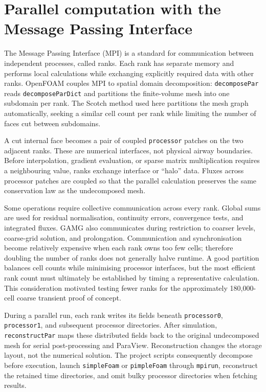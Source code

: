 \documentclass[11pt,a4paper]{article}
\begin{document}
\section{Parallel computation with the Message Passing Interface}
\label{app:mpi}

The Message Passing Interface (MPI) is a standard for communication between
independent processes, called ranks. Each rank has separate memory and performs
local calculations while exchanging explicitly required data with other ranks.
OpenFOAM couples MPI to spatial domain decomposition: \texttt{decomposePar}
reads \texttt{decomposeParDict} and partitions the finite-volume mesh into one
subdomain per rank. The Scotch method used here partitions the mesh graph
automatically, seeking a similar cell count per rank while limiting the number
of faces cut between subdomains.

A cut internal face becomes a pair of coupled \texttt{processor} patches on the
two adjacent ranks. These are numerical interfaces, not physical airway
boundaries. Before interpolation, gradient evaluation, or sparse matrix
multiplication requires a neighbouring value, ranks exchange interface or
``halo'' data. Fluxes across processor patches are coupled so that the parallel
calculation preserves the same conservation law as the undecomposed mesh.

Some operations require collective communication across every rank. Global
sums are used for residual normalisation, continuity errors, convergence tests,
and integrated fluxes. GAMG also communicates during restriction to coarser
levels, coarse-grid solution, and prolongation. Communication and
synchronisation become relatively expensive when each rank owns too few cells;
therefore doubling the number of ranks does not generally halve runtime. A good
partition balances cell counts while minimising processor interfaces, but the
most efficient rank count must ultimately be established by timing a
representative calculation. This consideration motivated testing fewer ranks
for the approximately 180,000-cell coarse transient proof of concept.

During a parallel run, each rank writes its fields beneath
\texttt{processor0}, \texttt{processor1}, and subsequent processor directories.
After simulation, \texttt{reconstructPar} maps these distributed fields back to
the original undecomposed mesh for serial post-processing and ParaView.
Reconstruction changes the storage layout, not the numerical solution. The
project scripts consequently decompose before execution, launch
\texttt{simpleFoam} or \texttt{pimpleFoam} through \texttt{mpirun}, reconstruct
the retained time directories, and omit bulky processor directories when
fetching results.
\end{document}
